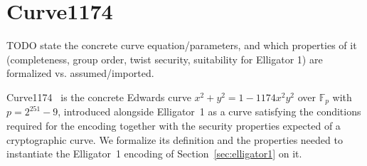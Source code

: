 \section{Curve1174}
\label{sec:curve1174}

TODO state the concrete curve equation/parameters, and
which properties of it (completeness, group order, twist security,
suitability for Elligator 1) are formalized vs. assumed/imported.

Curve1174~\cite[\S4]{bernstein2013a} is the concrete Edwards curve
$x^2 + y^2 = 1 - 1174x^2y^2$ over $\mathbb{F}_p$ with
$p = 2^{251} - 9$, introduced alongside Elligator~1 as a curve
satisfying the conditions required for the encoding together with
the security properties expected of a cryptographic curve. We
formalize its definition and the properties needed to instantiate
the Elligator~1 encoding of Section~\ref{sec:elligator1} on it.


